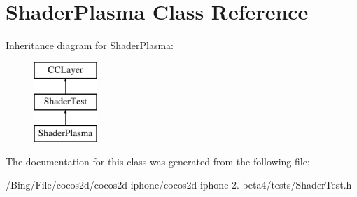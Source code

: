 \hypertarget{interface_shader_plasma}{\section{Shader\-Plasma Class Reference}
\label{interface_shader_plasma}
}
Inheritance diagram for Shader\-Plasma\-:\begin{figure}[H]
\begin{center}
\leavevmode
\includegraphics[height=3.000000cm]{interface_shader_plasma}
\end{center}
\end{figure}


The documentation for this class was generated from the following file\-:\begin{DoxyCompactItemize}
\item 
/\-Bing/\-File/cocos2d/cocos2d-\/iphone/cocos2d-\/iphone-\/2.-\/beta4/tests/Shader\-Test.\-h\end{DoxyCompactItemize}
